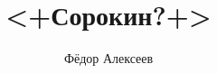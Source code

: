 



\title{<+Сорокин?+>}
\author{Фёдор Алексеев}
\raigorname{<++>}

\maketitle
\gitlink{}
\tableofcontents\newpage{}



